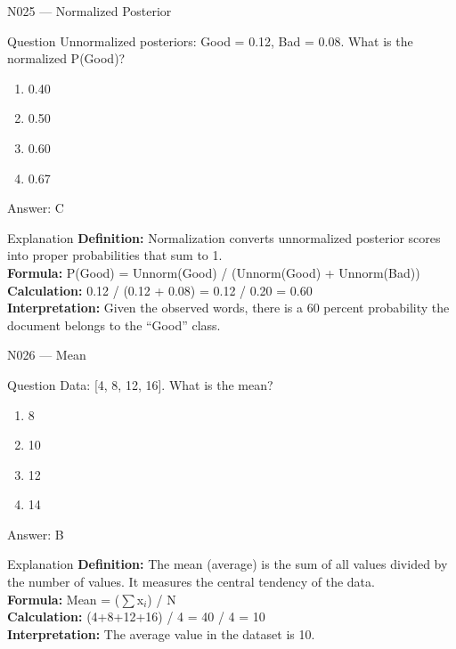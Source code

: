\documentclass[aspectratio=169,8pt]{beamer}
\begin{document}
	\begin{frame}{N025 --- Normalized Posterior}
		\begin{block}{Question}
			Unnormalized posteriors: Good = 0.12, Bad = 0.08. What is the normalized P(Good)?
			\begin{enumerate}
				\item 0.40
				\item 0.50
				\item 0.60
				\item 0.67
			\end{enumerate}
		\end{block}
		\begin{exampleblock}{Answer: C}\end{exampleblock}
		\begin{block}{Explanation}
			\textbf{Definition:} Normalization converts unnormalized posterior scores into proper probabilities that sum to 1.\\
			\textbf{Formula:} P(Good) = Unnorm(Good) / (Unnorm(Good) + Unnorm(Bad))\\
			\textbf{Calculation:} 0.12 / (0.12 + 0.08) = 0.12 / 0.20 = 0.60\\
			\textbf{Interpretation:} Given the observed words, there is a 60 percent probability the document belongs to the ``Good'' class.
		\end{block}
	\end{frame}
	
	\begin{frame}{N026 --- Mean}
		\begin{block}{Question}
			Data: [4, 8, 12, 16]. What is the mean?
			\begin{enumerate}
				\item 8
				\item 10
				\item 12
				\item 14
			\end{enumerate}
		\end{block}
		\begin{exampleblock}{Answer: B}\end{exampleblock}
		\begin{block}{Explanation}
			\textbf{Definition:} The mean (average) is the sum of all values divided by the number of values. It measures the central tendency of the data.\\
			\textbf{Formula:} Mean = ($\sum$x$_{i}$) / N\\
			\textbf{Calculation:} (4+8+12+16) / 4 = 40 / 4 = 10\\
			\textbf{Interpretation:} The average value in the dataset is 10.
		\end{block}
	\end{frame}
	
\end{document}
